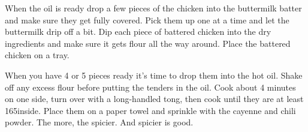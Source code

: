 \begin{IngredientsAndSteps}
{        When the oil is ready drop a few pieces of the chicken into the buttermilk batter and make sure they get fully
        covered. Pick them up one at a time and let the buttermilk drip off a bit. Dip each piece of battered chicken into
        the dry ingredients and make sure it gets flour all the way around. Place the battered chicken on a tray.

        When you have 4 or 5 pieces ready it's time to drop them into the hot oil. Shake off any excess flour before putting
        the tenders in the oil. Cook about 4 minutes on one side, turn over with a long-handled tong, then cook until they are
        at least 165\Degrees[F] inside. Place them on a paper towel and sprinkle with the cayenne and chili powder. The more, the
        spicier. And spicier is good.
    }
\end{IngredientsAndSteps}

%
%
%
%
\newpage



